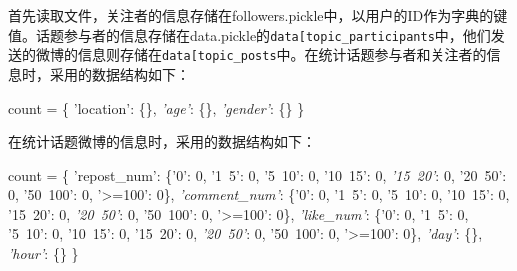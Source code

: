 \documentclass[a4paper,UTF8]{ctexart}
\newenvironment{Shaded}{}{}
\newcommand{\DecValTok}[1]{\textcolor[rgb]{0.25,0.63,0.44}{{#1}}}
\newcommand{\StringTok}[1]{\textcolor[rgb]{0.25,0.44,0.63}{{#1}}}
\newcommand{\CommentTok}[1]{\textcolor[rgb]{0.38,0.63,0.69}{\textit{{#1}}}}
\newcommand{\OperatorTok}[1]{\textcolor[rgb]{0.40,0.40,0.40}{{#1}}}
\newcommand{\NormalTok}[1]{{#1}}
\begin{document}
首先读取文件，关注者的信息存储在followers.pickle中，以用户的ID作为字典的键值。话题参与者的信息存储在data.pickle的\texttt{data{[}\textquotesingle{}topic\_participants\textquotesingle{}{]}}中，他们发送的微博的信息则存储在\texttt{data{[}\textquotesingle{}topic\_posts\textquotesingle{}{]}}中。在统计话题参与者和关注者的信息时，采用的数据结构如下：

\begin{Shaded}
\begin{Highlighting}[]
\NormalTok{count }\OperatorTok{=} \NormalTok{\{}
      \StringTok{'location'}\NormalTok{: \{\},}
      \CommentTok{'age'}\NormalTok{: \{\},}
      \CommentTok{'gender'}\NormalTok{: \{\}}
\NormalTok{\}}
\end{Highlighting}
\end{Shaded}

在统计话题微博的信息时，采用的数据结构如下：

\begin{Shaded}
\begin{Highlighting}[]
\NormalTok{count }\OperatorTok{=} \NormalTok{\{}
      \StringTok{'repost_num'}\NormalTok{: \{}\StringTok{'0'}\NormalTok{: }\DecValTok{0}\NormalTok{, }\StringTok{'1~5'}\NormalTok{: }\DecValTok{0}\NormalTok{, }\StringTok{'5~10'}\NormalTok{: }\DecValTok{0}\NormalTok{, }\StringTok{'10~15'}\NormalTok{: }\DecValTok{0}\NormalTok{,}
                     \CommentTok{'15~20'}\NormalTok{: }\DecValTok{0}\NormalTok{, }\StringTok{'20~50'}\NormalTok{: }\DecValTok{0}\NormalTok{, }\StringTok{'50~100'}\NormalTok{: }\DecValTok{0}\NormalTok{, }\StringTok{'>=100'}\NormalTok{: }\DecValTok{0}\NormalTok{\},}
      \CommentTok{'comment_num'}\NormalTok{: \{}\StringTok{'0'}\NormalTok{: }\DecValTok{0}\NormalTok{, }\StringTok{'1~5'}\NormalTok{: }\DecValTok{0}\NormalTok{, }\StringTok{'5~10'}\NormalTok{: }\DecValTok{0}\NormalTok{, }\StringTok{'10~15'}\NormalTok{: }\DecValTok{0}\NormalTok{, }\StringTok{'15~20'}\NormalTok{: }\DecValTok{0}\NormalTok{,}
                      \CommentTok{'20~50'}\NormalTok{: }\DecValTok{0}\NormalTok{, }\StringTok{'50~100'}\NormalTok{: }\DecValTok{0}\NormalTok{, }\StringTok{'>=100'}\NormalTok{: }\DecValTok{0}\NormalTok{\},}
      \CommentTok{'like_num'}\NormalTok{: \{}\StringTok{'0'}\NormalTok{: }\DecValTok{0}\NormalTok{, }\StringTok{'1~5'}\NormalTok{: }\DecValTok{0}\NormalTok{, }\StringTok{'5~10'}\NormalTok{: }\DecValTok{0}\NormalTok{, }\StringTok{'10~15'}\NormalTok{: }\DecValTok{0}\NormalTok{, }\StringTok{'15~20'}\NormalTok{: }\DecValTok{0}\NormalTok{,}
                   \CommentTok{'20~50'}\NormalTok{: }\DecValTok{0}\NormalTok{, }\StringTok{'50~100'}\NormalTok{: }\DecValTok{0}\NormalTok{, }\StringTok{'>=100'}\NormalTok{: }\DecValTok{0}\NormalTok{\},}
      \CommentTok{'day'}\NormalTok{: \{\},}
      \CommentTok{'hour'}\NormalTok{: \{\}}
\NormalTok{\}}
\end{Highlighting}
\end{Shaded}
\end{document}
